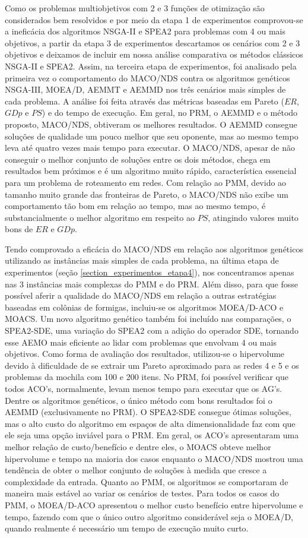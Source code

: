 Como os problemas multiobjetivos com 2 e 3 funções de otimização são considerados bem resolvidos e por meio da etapa 1 de experimentos comprovou-se a ineficácia dos algoritmos NSGA-II e SPEA2 para problemas com 4 ou mais objetivos, a partir da etapa 3 de experimentos descartamos os cenários com 2 e 3 objetivos e deixamos de incluir em nossa análise comparativa os métodos clássicos NSGA-II e SPEA2. Assim, na terceira etapa de experimentos, foi analisado pela primeira vez o comportamento do MACO/NDS contra os algoritmos genéticos NSGA-III, MOEA/D, AEMMT e AEMMD nos três cenários mais simples de cada problema. A análise foi feita através das métricas baseadas em Pareto ($ER$, $GDp$ e $PS$) e do tempo de execução. Em geral, no PRM, o AEMMD e o método proposto, MACO/NDS, obtiveram os melhores resultados. O AEMMD consegue soluções de qualidade um pouco melhor que seu oponente, mas ao mesmo tempo leva até quatro vezes mais tempo para executar. O MACO/NDS, apesar de não conseguir o melhor conjunto de soluções entre os dois métodos, chega em resultados bem próximos e é um algoritmo muito rápido, característica essencial para um problema de roteamento em redes. Com relação ao PMM, devido ao tamanho muito grande das fronteiras de Pareto, o MACO/NDS não exibe um comportamento tão bom em relação ao tempo, mas ao mesmo tempo, é substancialmente o melhor algoritmo em respeito ao $PS$, atingindo valores muito bons de $ER$ e $GDp$.

Tendo comprovado a eficácia do MACO/NDS em relação aos algoritmos genéticos utilizando as instâncias mais simples de cada problema, na última etapa de experimentos (seção \ref{section_experimentos_etapa4}), nos concentramos apenas nas 3 instâncias mais complexas do PMM e do PRM. Além disso, para que fosse possível aferir a qualidade do MACO/NDS em relação a outras estratégias baseadas em colônias de formigas, incluiu-se os algoritmos MOEA/D-ACO e MOACS. Um novo algoritmo genético também foi incluído nas comparações, o SPEA2-SDE, uma variação do SPEA2 com a adição do operador SDE, tornando esse AEMO mais eficiente ao lidar com problemas que envolvam 4 ou mais objetivos. Como forma de avaliação dos resultados, utilizou-se o hipervolume devido à dificuldade de se extrair um Pareto aproximado para as redes 4 e 5 e os problemas da mochila com 100 e 200 itens. No PRM, foi possível verificar que todos ACO's, normalmente, levam menos tempo para executar que os AG's. Dentre os algoritmos genéticos, o único método com bons resultados foi o AEMMD (exclusivamente no PRM). O SPEA2-SDE consegue ótimas soluções, mas o alto custo do algoritmo em espaços de alta dimensionalidade faz com que ele seja uma opção inviável para o PRM. Em geral, os ACO's apresentaram uma melhor relação de custo/benefício e dentre eles, o MOACS obteve melhor hipervolume e tempo na maioria dos casos enquanto o MACO/NDS mostrou uma tendência de obter o melhor conjunto de soluções à medida que cresce a complexidade da entrada. Quanto ao PMM, os algoritmos se comportaram de maneira mais estável ao variar os cenários de testes. Para todos os casos do PMM, o MOEA/D-ACO apresentou o melhor custo benefício entre hipervolume e tempo, fazendo com que o único outro algoritmo considerável seja o MOEA/D, quando realmente é necessário um tempo de execução muito curto.

